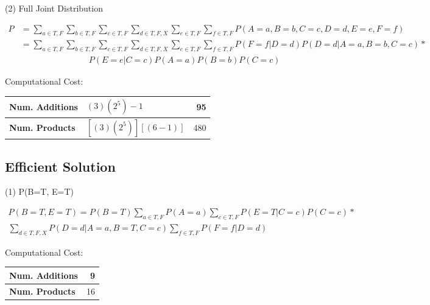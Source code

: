\documentclass[12pt, letterpaper]{report}
\begin{document}
(2) \qquad Full Joint Distribution


\begin{equation*}
\begin{split}
P &= \sum_{a\in T,F}\sum_{b\in T,F}\sum_{c\in T,F}\sum_{d\in T,F,X}\sum_{e\in T,F}\sum_{f\in T,F} P(A=a,B=b,C=c,D=d,E=e,F=f)\\
&= \sum_{a\in T,F}\sum_{b\in T,F}\sum_{c\in T,F}\sum_{d\in T,F,X}\sum_{e\in T,F}\sum_{f\in T,F} P(F=f|D=d)P(D=d|A=a,B=b,C=c) * \\&\qquad\qquad\qquad\qquad P(E=e|C=c)P(A=a)P(B=b)P(C=c)
\end{split}
\end{equation*}

Computational Cost:

\begin{table}[H]
	\begin{tabular}{ |l|l|r| }
		\hline
		\textbf{Num. Additions} & $(3)(2^5)-1$ & 95 \\
		\hline
		\textbf{Num. Products} & $ [(3)(2^5)][(6-1)]$ & 480 \\
		\hline
	\end{tabular}
\end{table}


\subsection{Efficient Solution}

(1) \qquad P(B=T, E=T)

\begin{equation*}
\begin{multlined}
P(B=T,E=T) = P(B=T)\sum_{a\in T,F}P(A=a)\sum_{c\in T,F}P(E=T|C=c)P(C=c)* \\
\sum_{d\in T,F,X}P(D=d|A=a,B=T,C=c)\sum_{f\in T,F}P(F=f|D=d)
\end{multlined}
\end{equation*}

Computational Cost:

\begin{table}[H]
	\begin{tabular}{ |l|r| }
		\hline
		\textbf{Num. Additions} & 9\\
		\hline
		\textbf{Num. Products} & 16	\\
		\hline
	\end{tabular}
\end{table}
\end{document}
